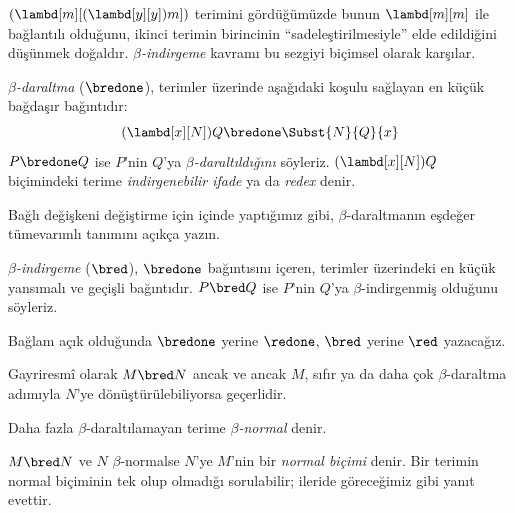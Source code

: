 \documentclass[../../../include/open-logic-section]{subfiles}
\begin{document}

$(\lambd[m][(\lambd[y][y]) m])$ terimini gördüğümüzde bunun
$\lambd[m][m]$ ile bağlantılı olduğunu, ikinci terimin birincinin
``sadeleştirilmesiyle'' elde edildiğini düşünmek doğaldır.
\emph{$\beta$-indirgeme} kavramı bu sezgiyi biçimsel olarak karşılar.

\begin{defn} 
  \emph{$\beta$-daraltma} ($\bredone$), terimler üzerinde aşağıdaki koşulu
  sağlayan en küçük bağdaşır bağıntıdır:
  \[
    (\lambd[x][N])Q \bredone \Subst{N}{Q}{x}
  \]
  $P\bredone Q$ ise $P$'nin $Q$'ya \emph{$\beta$-daraltıldığını} söyleriz.
  $(\lambd[x][N])Q$ biçimindeki terime \emph{indirgenebilir ifade} ya da
  \emph{redex} denir.
\end{defn}

\begin{prob} 
  Bağlı değişkeni değiştirme için
   içinde yaptığımız gibi,
  $\beta$-daraltmanın eşdeğer tümevarımlı tanımını açıkça yazın.
\end{prob}

\begin{defn} 
  \emph{$\beta$-indirgeme} ($\bred$), $\bredone$ bağıntısını içeren,
  terimler üzerindeki en küçük yansımalı ve geçişli bağıntıdır. $P\bred Q$
  ise $P$'nin $Q$'ya $\beta$-indirgenmiş olduğunu söyleriz.
\end{defn}

Bağlam açık olduğunda $\bredone$ yerine $\redone$, $\bred$ yerine $\red$
yazacağız.

Gayriresmî olarak $M\bred N$ ancak ve ancak $M$, sıfır ya da daha çok
$\beta$-daraltma adımıyla $N$'ye dönüştürülebiliyorsa geçerlidir.

\begin{defn}
Daha fazla $\beta$-daraltılamayan terime \emph{$\beta$-normal} denir.
\end{defn}

$M\bred N$ ve $N$ $\beta$-normalse $N$'ye $M$'nin bir \emph{normal biçimi}
denir. Bir terimin normal biçiminin tek olup olmadığı sorulabilir; ileride
göreceğimiz gibi yanıt evettir.
\end{document}
